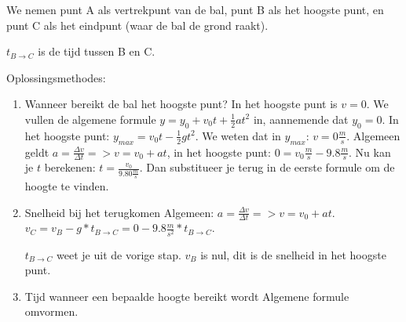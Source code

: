  We nemen punt A als vertrekpunt van de bal, punt B als het hoogste punt, en punt C als het eindpunt (waar de bal de grond raakt).
 
 \( t_{B \to C} \) is de tijd tussen B en C.
 
 Oplossingsmethodes:
 
 \begin{enumerate}
 	\item Wanneer bereikt de bal het hoogste punt?
 	In het hoogste punt is \(v=0\). We vullen de algemene formule \(y = y_0 + v_0t + \frac{1}{2} at^2 \) in, aannemende dat \(y_0 = 0\). In het hoogste punt: \( y_{max} = v_0t - \frac{1}{2} g t^2 \). We weten dat in \(y_{max}\): \( v = 0 \frac{m}{s}\). Algemeen geldt \( a = \frac{\Delta v}{\Delta t} => v = v_0 + at \), in het hoogste punt: \( 0 = v_0\frac{m}{s} - 9.8 \frac{m}{s} \). Nu kan je \(t\) berekenen: \(t = \frac{v_0}{9.80 \frac{m}{s}}\). Dan substitueer je terug in de eerste formule om de hoogte te vinden.
 	
 	\item Snelheid bij het terugkomen
 	Algemeen: \(a = \frac{\Delta v}{\Delta t} => v = v_0 + at\). \(v_C = v_B - g * t_{B \to C} = 0 - 9.8 \frac{m}{s^2} * t_{B \to C} \).
 	
 	\(t_{B \to C}\) weet je uit de vorige stap. \(v_B\) is nul, dit is de snelheid in het hoogste punt.
 	
 	\item Tijd wanneer een bepaalde hoogte bereikt wordt
 	Algemene formule omvormen.
 \end{enumerate}
 